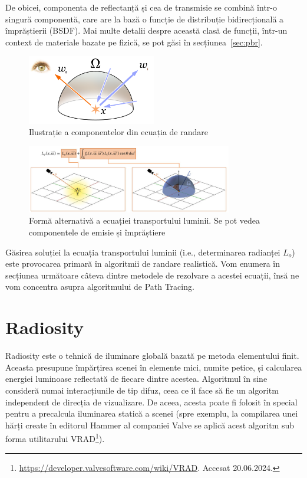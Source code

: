 \documentclass[12pt,a4paper]{report}
\numberwithin{equation}{section} %
\begin{document}
De obicei, componenta de reflectanță și cea de transmisie se combină într-o singură
componentă, care are la bază o funcție de distribuție bidirecțională a împrăștierii (BSDF).
Mai multe detalii despre această clasă de funcții, într-un context de materiale
bazate pe fizică, se pot găsi în secțiunea~\ref{sec:pbr}.

\begin{figure}[ht]
	\centering
	\includegraphics[width=0.5\textwidth]{pics/rendering_eq2.png}
	\caption{Ilustrație a componentelor din ecuația de randare\protect{}}
	\label{fig:light_transport2}
\end{figure}

\begin{figure}[ht]
	\centering
	\includegraphics[width=0.8\textwidth]{pics/rendering_eq.png}
	\caption{Formă alternativă a ecuației transportului luminii. Se pot vedea componentele de emisie și împrăștiere\protect\footnotemark}
	\label{fig:light_transport}
\end{figure}

Găsirea soluției la ecuația transportului luminii (i.e., determinarea radianței $L_o$)
este provocarea primară în algoritmii de randare realistică. Vom enumera în secțiunea următoare câteva dintre
metodele de rezolvare a acestei ecuații, însă ne vom concentra asupra algoritmului
de Path Tracing.


\section{Radiosity}\label{sec:radiosity}
Radiosity este o tehnică de iluminare globală bazată pe metoda elementului finit.
Aceasta presupune împărțirea scenei în elemente mici, numite petice, și calcularea
energiei luminoase reflectată de fiecare dintre acestea. Algoritmul în sine consideră
numai interacțiunile de tip difuz, ceea ce îl face să fie un algoritm independent
de direcția de vizualizare. De aceea, acesta poate fi folosit în special pentru a precalcula
iluminarea statică a scenei (spre exemplu, la compilarea unei hărți create în editorul
Hammer al companiei Valve se aplică acest algoritm sub forma utilitarului VRAD\footnote{\url{https://developer.valvesoftware.com/wiki/VRAD}. Accesat 20.06.2024.}).
\end{document}
